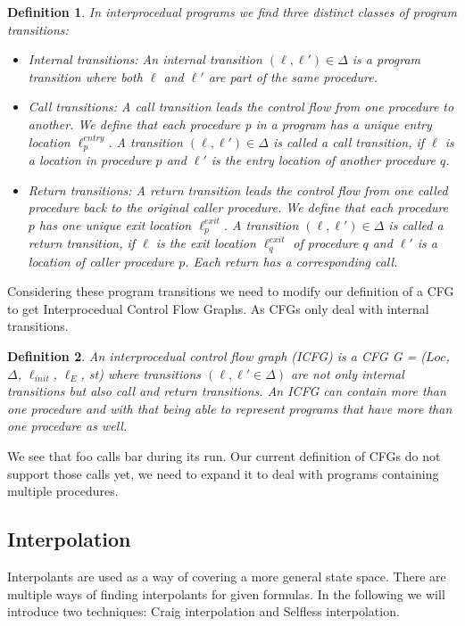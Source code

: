 \documentclass{article}
\newtheorem{mydef}{Definition}
\newcommand\mycom[1]{}
\newcommand\mycom[1]{#1}
\newcommand{\jw}[1]{\mycom{\todo[color=blue!40,inline]{\small JW: #1}}}
\begin{document}
	\begin{mydef} In interprocedual programs we find three distinct classes of program transitions:
		\begin{itemize}
			\item Internal transitions: An internal transition $(\ell, \ell') \in \Delta$ is a program transition where both $\ell$ and $\ell'$ are part of the same procedure. 
			
			\item Call transitions:  A call transition leads the control flow from one procedure to another. We define that each procedure p in a program has a unique entry location $\ell^{entry}_p$. A transition $(\ell, \ell') \in \Delta$ is called a call transition, if $\ell$ is a location in procedure $p$ and $\ell'$ is the entry location of another procedure $q$.
			
			\item Return transitions: A return transition leads the control flow from one called procedure back to the original caller procedure. We define that each procedure $p$ has one unique exit location $\ell^{exit}_p$. A transition $(\ell, \ell') \in \Delta$ is called a return transition, if $\ell$ is the exit location $\ell_q^{exit}$ of procedure $q$ and $\ell'$ is a location of caller procedure $p$. Each return has a corresponding call.
		\end{itemize}
	\end{mydef}
\jw{explain the formulas}
	 \bigskip\noindent
	Considering these program transitions we need to modify our definition of a CFG to get Interprocedual Control Flow Graphs. As CFGs only deal with internal transitions.
	\begin{mydef}
		An interprocedual control flow graph (ICFG) is a CFG G = ($Loc$, $\Delta$, $\ell_{init}$, $\ell_E$, st) where transitions $(\ell, \ell' \in \Delta)$ are not only internal transitions but also call and return transitions. An ICFG can contain more than one procedure and with that being able to represent programs that have more than one procedure as well.
	\end{mydef}
	
	\jw{\textbf{@ToDo extend example by procedure call}} 
	We see that foo calls bar during its run. Our current definition of CFGs do not support those calls yet, we need to expand it to deal with programs containing multiple procedures.
	
	
	\pagebreak
		
	\subsection{Interpolation}
	Interpolants are used as a way of covering a more general state space. There are multiple ways of finding interpolants for given formulas.
	In the following we will introduce two techniques: Craig interpolation and Selfless interpolation. 
	\jw{citation needed}
	
\end{document}
